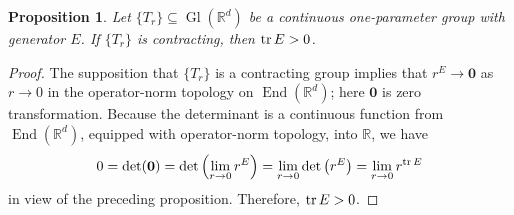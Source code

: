 \documentclass[11pt]{article}
\newtheorem{proposition}[theorem]{Proposition}
\theoremstyle{remark}
\newcommand\End{\operatorname{End}} %
\newcommand\Gl{\operatorname{Gl}} %
\renewcommand\det{\operatorname{det}}
\begin{document}
\begin{proposition}\label{prop:ContractingTrace}
Let $\{T_r\}\subseteq \Gl(\mathbb{R}^d)$ be a continuous one-parameter group with generator $E$. If $\{T_r\}$ is  contracting, then $\tr E>0$. 
\end{proposition}
\begin{proof}
The supposition that $\{T_r\}$ is a contracting group implies that $r^E\to \mathbf{0}$ as $r\to 0$ in the operator-norm topology on $\End(\mathbb{R}^d)$; here $\mathbf{0}$ is zero transformation. Because the determinant is a continuous function from $\End(\mathbb{R}^d)$, equipped with operator-norm topology, into $\mathbb{R}$, we have
\begin{equation*}
0=\det(\mathbf{0})=\det\left(\lim_{r\to 0}r^E\right)=\lim_{r\to 0}\det\left(r^E\right)=\lim_{r\to 0}r^{\tr E}
\end{equation*}
in view of the preceding proposition. Therefore, $\tr E>0$.
\end{proof}





\end{document}
